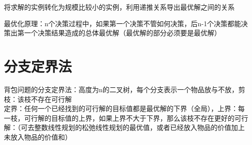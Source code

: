 \documentclass[12pt, a4paper, oneside]{ctexart}
\begin{document}
将求解的实例转化为规模比较小的实例，利用递推关系导出最优解之间的关系

最优化原理：n个决策过程中，如果第一个决策不管如何决策，后n-1个决策都能决策出第一个决策结果造成的总体最优解（最优解的部分必须要是最优解）


\section{分支定界法}
背包问题的分支定界法：高度为n的二叉树，每个分支表示一个物品放与不放，剪枝：该枝不存在可行解\\
定界：任何一个已经找到的可行解的目标值都是最优解的下界（全局），上界：每一枝，可行解的目标值的上界，如果上界不大于下界，那么该枝不存在更好的可行解：（可去整数线性规划的松弛线性规划的最优值，或者已经放入物品的价值加上未放入物品的价值和）






















% 
% 
\end{document}
